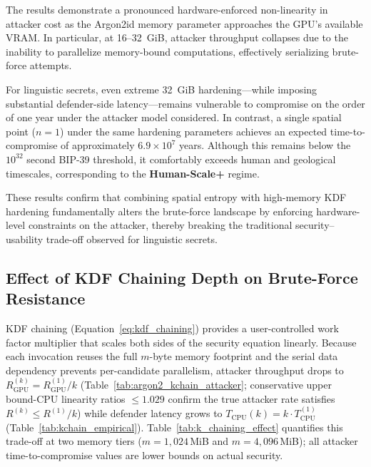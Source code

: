 \documentclass[journal,article,submit,pdftex,moreauthors]{Definitions/mdpi}
\newcommand{\add}[1]{#1}
\newcommand{\add}[1]{\added{#1}}
\begin{document}
The results demonstrate a pronounced hardware-enforced non-linearity in attacker cost as the Argon2id memory parameter approaches the GPU’s available VRAM. In particular, at 16–32~GiB, attacker throughput collapses due to the inability to parallelize memory-bound computations, effectively serializing brute-force attempts.

For linguistic secrets, even extreme 32~GiB hardening—while imposing substantial defender-side latency—remains vulnerable to compromise on the order of one year under the attacker model considered. In contrast, a single spatial point ($n=1$) under the same hardening parameters achieves an expected time-to-compromise of approximately $6.9 \times 10^{7}$ years. Although this remains below the $10^{32}$ second BIP-39 threshold, it comfortably exceeds human and geological timescales, corresponding to the \textbf{Human-Scale+} regime.

These results confirm that combining spatial entropy with high-memory KDF hardening fundamentally alters the brute-force landscape by enforcing hardware-level constraints on the attacker, thereby breaking the traditional security–usability trade-off observed for linguistic secrets.

\subsection{\add{Effect of KDF Chaining Depth on Brute-Force Resistance}}
\label{sec:kchain_analysis}
\label{sec:kchain_spectrum}

\add{KDF chaining (Equation~\ref{eq:kdf_chaining}) provides a user-controlled work factor multiplier that scales both sides of the security equation linearly. Because each invocation reuses the full $m$-byte memory footprint and the serial data dependency prevents per-candidate parallelism, attacker throughput drops to $R_\text{GPU}^{(k)} = R_\text{GPU}^{(1)} / k$ (Table~\ref{tab:argon2_kchain_attacker}; conservative upper bound-CPU linearity ratios $\leq 1.029$ confirm the true attacker rate satisfies $R^{(k)} \leq R^{(1)}/k$) while defender latency grows to $T_\text{CPU}(k) = k \cdot T_\text{CPU}^{(1)}$ (Table~\ref{tab:kchain_empirical}). Table~\ref{tab:k_chaining_effect} quantifies this trade-off at two memory tiers ($m=1{,}024$\,MiB and $m=4{,}096$\,MiB); all attacker time-to-compromise values are lower bounds on actual security.}
\end{document}
